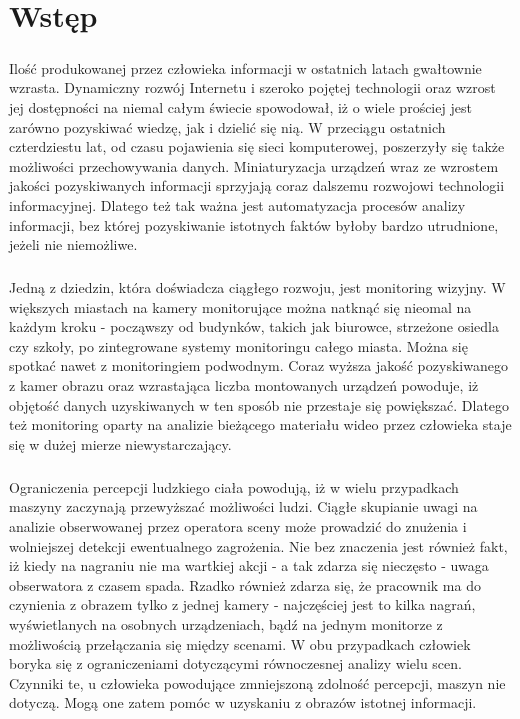 \chapter{Wstęp}
\label{cha:wstęp}

\paragraph{}
Ilość produkowanej przez człowieka informacji w ostatnich latach gwałtownie wzrasta. Dynamiczny rozwój  Internetu i szeroko pojętej technologii  oraz wzrost jej dostępności na niemal całym świecie spowodował, iż o wiele prościej jest zarówno pozyskiwać wiedzę, jak i dzielić się nią. W przeciągu ostatnich czterdziestu lat, od czasu pojawienia się sieci komputerowej, poszerzyły się także możliwości przechowywania danych. Miniaturyzacja urządzeń wraz ze wzrostem jakości pozyskiwanych informacji sprzyjają coraz dalszemu rozwojowi technologii informacyjnej. Dlatego też tak ważna jest automatyzacja procesów analizy informacji, bez której pozyskiwanie istotnych faktów byłoby bardzo utrudnione, jeżeli nie niemożliwe. 
\paragraph{}
Jedną z dziedzin, która doświadcza ciągłego rozwoju, jest monitoring wizyjny. W większych miastach na kamery monitorujące można natknąć się nieomal na każdym kroku - począwszy od budynków, takich jak biurowce, strzeżone osiedla czy szkoły, po zintegrowane systemy monitoringu całego miasta. Można się spotkać nawet z monitoringiem podwodnym. Coraz wyższa jakość pozyskiwanego z kamer obrazu oraz wzrastająca liczba montowanych urządzeń powoduje, iż objętość danych uzyskiwanych w ten sposób nie przestaje się powiększać. Dlatego też monitoring oparty na analizie bieżącego materiału wideo przez człowieka staje się w dużej mierze niewystarczający.
\paragraph{}
Ograniczenia percepcji ludzkiego ciała powodują, iż w wielu przypadkach maszyny zaczynają przewyższać możliwości ludzi. Ciągłe skupianie uwagi na analizie obserwowanej przez operatora sceny może prowadzić do znużenia i wolniejszej detekcji ewentualnego zagrożenia. Nie bez znaczenia jest również fakt, iż kiedy na nagraniu nie ma wartkiej akcji - a tak zdarza się nieczęsto - uwaga obserwatora z czasem spada. Rzadko również zdarza się, że pracownik ma do czynienia z obrazem tylko z jednej kamery - najczęściej jest to kilka nagrań, wyświetlanych na osobnych urządzeniach, bądź na jednym monitorze z możliwością przełączania się między scenami. W obu przypadkach człowiek boryka się z ograniczeniami dotyczącymi równoczesnej analizy wielu scen. Czynniki te, u człowieka powodujące zmniejszoną zdolność percepcji, maszyn nie dotyczą. Mogą one zatem pomóc w uzyskaniu z obrazów istotnej informacji.
